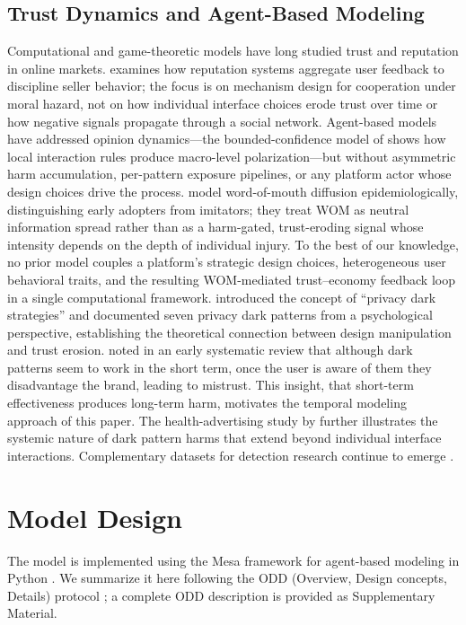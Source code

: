 \documentclass[a4paper,fleqn]{cas-sc}
\begin{document}
\subsection{Trust Dynamics and Agent-Based Modeling}
Computational and game-theoretic models have long studied trust and reputation in online markets. \citet{dellarocas2006} examines how reputation systems aggregate user feedback to discipline seller behavior; the focus is on mechanism design for cooperation under moral hazard, not on how individual interface choices erode trust over time or how negative signals propagate through a social network. Agent-based models have addressed opinion dynamics---the bounded-confidence model of \citet{deffuant2000} shows how local interaction rules produce macro-level polarization---but without asymmetric harm accumulation, per-pattern exposure pipelines, or any platform actor whose design choices drive the process. \citet{goldenberg2001} model word-of-mouth diffusion epidemiologically, distinguishing early adopters from imitators; they treat WOM as neutral information spread rather than as a harm-gated, trust-eroding signal whose intensity depends on the depth of individual injury. To the best of our knowledge, no prior model couples a platform's strategic design choices, heterogeneous user behavioral traits, and the resulting WOM-mediated trust--economy feedback loop in a single computational framework. \citet{bosch2016} introduced the concept of ``privacy dark strategies'' and documented seven privacy dark patterns from a psychological perspective, establishing the theoretical connection between design manipulation and trust erosion. \citet{cara2019} noted in an early systematic review that although dark patterns seem to work in the short term, once the user is aware of them they disadvantage the brand, leading to mistrust. This insight, that short-term effectiveness produces long-term harm, motivates the temporal modeling approach of this paper. The health-advertising study by \citet{downing2022} further illustrates the systemic nature of dark pattern harms that extend beyond individual interface interactions. Complementary datasets for detection research continue to emerge \citep{yada2022}.

\section{Model Design}
\label{sec:model}
The model is implemented using the Mesa framework for agent-based modeling in Python \citep{mesa2024}. We summarize it here following the ODD (Overview, Design concepts, Details) protocol \citep{grimm2020}; a complete ODD description is provided as Supplementary Material.
\end{document}
